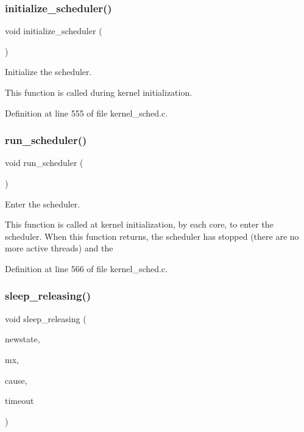 \subsubsection{\texorpdfstring{initialize\+\_\+scheduler()}{initialize\_scheduler()}}
{\footnotesize\ttfamily void initialize\+\_\+scheduler (\begin{DoxyParamCaption}\item[{void}]{ }\end{DoxyParamCaption})}



Initialize the scheduler. 

This function is called during kernel initialization. 

Definition at line 555 of file kernel\+\_\+sched.\+c.

\mbox{\label{group__scheduler_ga147600b59d656eb9d9558673c2fad36d}} 
\subsubsection{\texorpdfstring{run\+\_\+scheduler()}{run\_scheduler()}}
{\footnotesize\ttfamily void run\+\_\+scheduler (\begin{DoxyParamCaption}\item[{void}]{ }\end{DoxyParamCaption})}



Enter the scheduler. 

This function is called at kernel initialization, by each core, to enter the scheduler. When this function returns, the scheduler has stopped (there are no more active threads) and the 

Definition at line 566 of file kernel\+\_\+sched.\+c.

\mbox{\label{group__scheduler_ga0ab1a2dcfbfe3fb09cc24044efddfd34}} 
\subsubsection{\texorpdfstring{sleep\+\_\+releasing()}{sleep\_releasing()}}
{\footnotesize\ttfamily void sleep\+\_\+releasing (\begin{DoxyParamCaption}\item[{\hyperlink{group__scheduler_ga6c969c169777f82c104cf73e501df70f}{Thread\+\_\+state}}]{newstate,  }\item[{\hyperlink{group__syscalls_gaef2ec62cae8e0031fd19fc8b91083ade}{Mutex} $\ast$}]{mx,  }\item[{enum \hyperlink{group__scheduler_gaad787d8d80312ffca3c0f197b3a25fbe}{S\+C\+H\+E\+D\+\_\+\+C\+A\+U\+SE}}]{cause,  }\item[{\hyperlink{bios_8h_ae7291e5cd742fb9bc6d4aaa0d51bd0ee}{Timer\+Duration}}]{timeout }\end{DoxyParamCaption})}



